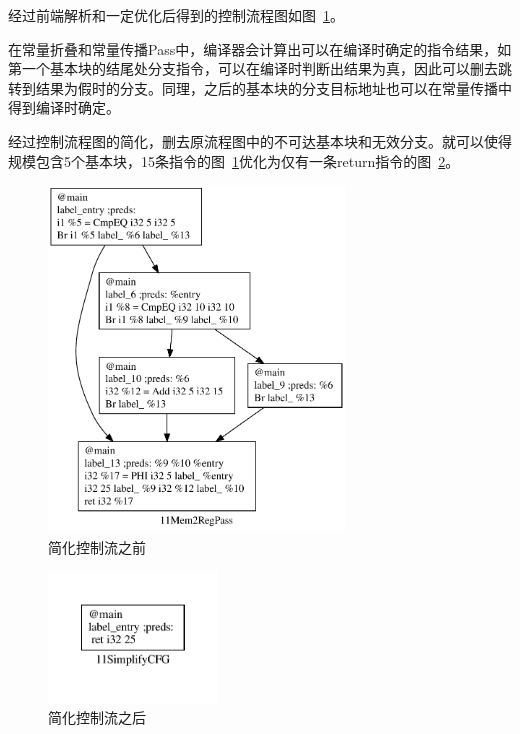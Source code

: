 经过前端解析和一定优化后得到的控制流程图如图~\ref{fig:cfg0}。

在常量折叠和常量传播Pass中，编译器会计算出可以在编译时确定的指令结果，如第一个基本块的结尾处分支指令，可以在编译时判断出结果为真，因此可以删去跳转到结果为假时的分支。同理，之后的基本块的分支目标地址也可以在常量传播中得到编译时确定。

经过控制流程图的简化，删去原流程图中的不可达基本块和无效分支。就可以使得规模包含5个基本块，15条指令的图~\ref{fig:cfg0}优化为仅有一条return指令的图~\ref{fig:cfg1}。

\begin{figure}[htb]
  \centering
  \includegraphics[width=0.7\textwidth]{figures/cfgsimplify0.pdf}
  \caption{简化控制流之前}
  \label{fig:cfg0}
\end{figure}


\begin{figure}[htb]
  \centering
  \includegraphics[width=0.4\textwidth]{figures/cfgsimplify1.pdf}
  \caption{简化控制流之后}
  \label{fig:cfg1}
\end{figure}
